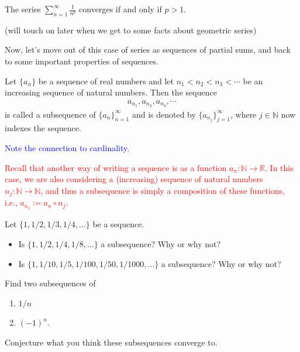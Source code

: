\documentclass{ximera}
\begin{document}
\begin{corollary}
    The series $\sum\limits_{n=1}^\infty \frac{1}{n^p}$ converges if and only if $p >1$.
\end{corollary}
(will touch on later when we get to some facts about geometric series)

Now, let's move out of this case of series as sequences of partial sums, and back to some important properties of sequences.

\begin{definition}
    Let $\{a_n\}$ be a sequence of real numbers and let $n_1 < n_2< n_3 < \cdots$ be an increasing sequence of natural numbers.  Then the sequence
    \begin{align*}
        a_{n_1}, a_{n_2}, a_{n_3}, \cdots
    \end{align*}
    is called a subsequence of $\{a_n\}_{n=1}^\infty$ and is denoted by $\{a_{n_j}\}_{j=1}^\infty$, where $j \in \mathbb{N}$ now indexes the sequence.
\end{definition}
\textcolor{blue}{Note the connection to cardinality.}

\textcolor{red}{Recall that another way of writing a sequence is as a function $a_n: \mathbb{N} \to \mathbb{R}$.  In this case, we are also considering a (increasing) sequence of natural numbers $n_j : \mathbb{N} \to \mathbb{N}$, and thus a subsequence is simply a composition of these functions, i.e., $a_{n_j}:= a_n \circ n_j$.}

\begin{exercise}
    Let $\{1, 1/2, 1/3, 1/4, ...\}$ be a sequence.
    \begin{itemize}
        \item Is $\{1, 1/2, 1/4, 1/8, ...\}$ a subsequence?  Why or why not?
        \item Is $\{1, 1/10, 1/5, 1/100, 1/50, 1/1000, \ldots\}$ a subsequence?  Why or why not?
    \end{itemize}
\end{exercise}

\begin{exercise}
    Find two subsequences of 
    \begin{enumerate}
        \item $1/n$
        \item $(-1)^n$.
    \end{enumerate}
    Conjecture what you think these subsequences converge to.
\end{exercise}
\end{document}
